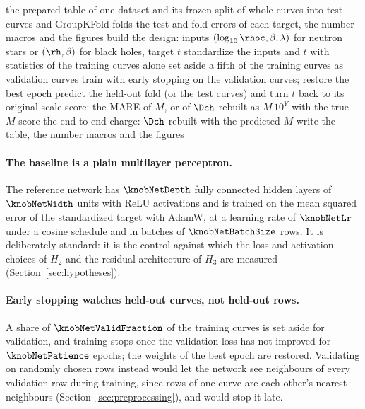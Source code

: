 \begin{algorithm}[!htb]
\caption{The surrogate pipeline, run once per dataset; every model of this work passes through it.}
\label{alg:pipeline}
\begin{algorithmic}[1]
\Require the prepared table of one dataset and its frozen split of whole curves into test curves and GroupKFold folds
\Ensure the test and fold errors of each target, the number macros and the figures
  \State build the design: inputs $(\log_{10}\rhoc, \beta, \lambda)$ for neutron stars or $(\rh, \beta)$ for black holes, target $t$
    \State standardize the inputs and $t$ with statistics of the training curves alone
    \State set aside a fifth of the training curves as validation curves
    \State train with early stopping on the validation curves; restore the best epoch
    \State predict the held-out fold (or the test curves) and turn $t$ back to its original scale
  \EndFor
  \State score: the MARE of $M$, or of $\Dch$ rebuilt as $M\,10^{Y}$ with the true $M$
\EndFor
\State score the end-to-end charge: $\Dch$ rebuilt with the predicted $M$
\State write the table, the number macros and the figures
\end{algorithmic}
\end{algorithm}

\paragraph{The baseline is a plain multilayer perceptron.}
The reference network has $\knobNetDepth$ fully connected hidden layers of $\knobNetWidth$ units with ReLU activations and is trained on the mean squared error of the standardized target with AdamW, at a learning rate of $\knobNetLr$ under a cosine schedule and in batches of $\knobNetBatchSize$ rows. It is deliberately standard: it is the control against which the loss and activation choices of $H_2$ and the residual architecture of $H_3$ are measured (Section~\ref{sec:hypotheses}).

\paragraph{Early stopping watches held-out curves, not held-out rows.}
A share of $\knobNetValidFraction$ of the training curves is set aside for validation, and training stops once the validation loss has not improved for $\knobNetPatience$ epochs; the weights of the best epoch are restored. Validating on randomly chosen rows instead would let the network see neighbours of every validation row during training, since rows of one curve are each other's nearest neighbours (Section~\ref{sec:preprocessing}), and would stop it late.

